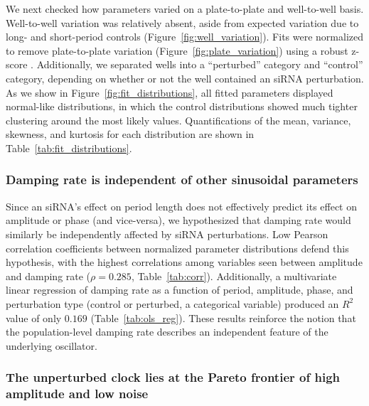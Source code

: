 \documentclass[11pt, letterpaper]{article}
\begin{document}
We next checked how parameters varied on a plate-to-plate and well-to-well basis.
Well-to-well variation was relatively absent, aside from expected variation due to long- and short-period controls (Figure~\ref{fig:well_variation}).
Fits were normalized to remove plate-to-plate variation (Figure~\ref{fig:plate_variation}) using a robust z-score \cite{Birmingham2009}.
Additionally, we separated wells into a ``perturbed'' category and ``control'' category, depending on whether or not the well contained an siRNA perturbation.
As we show in Figure~\ref{fig:fit_distributions}, all fitted parameters displayed normal-like distributions, in which the control distributions showed much tighter clustering around the most likely values.
Quantifications of the mean, variance, skewness, and kurtosis for each distribution are shown in Table~\ref{tab:fit_distributions}.

\subsubsection*{Damping rate is independent of other sinusoidal parameters}

Since an siRNA's effect on period length does not effectively predict its effect on amplitude or phase (and vice-versa), we hypothesized that damping rate would similarly be independently affected by siRNA perturbations.
Low Pearson correlation coefficients between normalized parameter distributions defend this hypothesis, with the highest correlations among variables seen between amplitude and damping rate ($\rho = 0.285$, Table~\ref{tab:corr}).
Additionally, a multivariate linear regression of damping rate as a function of period, amplitude, phase, and perturbation type (control or perturbed, a categorical variable) produced an $R^2$ value of only $0.169$ (Table~\ref{tab:ols_reg}).
These results reinforce the notion that the population-level damping rate describes an independent feature of the underlying oscillator.

\subsubsection*{The unperturbed clock lies at the Pareto frontier of high amplitude and low noise}
\end{document}
